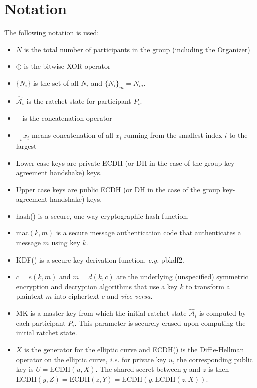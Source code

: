 \documentclass[%
preprint,
amsmath,amssymb,
aps,
prb,
floatfix,
]{revtex4-1}
\begin{document}
\section{\label{sec:notation}Notation}
The following notation is used:
\begin{itemize}
\item $N$ is the total number of participants in the group (including the
Organizer)
\item $\oplus$ is the bitwise XOR operator
\item $\{N_i\}$ is the set of all $N_i$ and $\{N_i\}_m = N_m$.
\item $\mathcal{\hat{A}}_i$ is the ratchet state for
participant $P_i$.
\item $||$ is the concatenation operator
\item $||_i \, x_i$ means concatenation of all $x_i$ running from the smallest
index $i$ to the largest
\item Lower case keys are private ECDH (or DH in the case of the group
key-agreement handshake) keys.
\item Upper case keys are public ECDH (or DH in the case of the group
key-agreement handshake) keys.
\item hash() is a secure, one-way cryptographic hash function.
\item mac$(k,m)$ is a secure message authentication code that
authenticates a message $m$ using key $k$.
\item KDF() is a secure key derivation function, \textit{e.g.} pbkdf2.
\item $c = e(k, m)$ and $m = d(k,c)$ are the underlying (unspecified) symmetric
encryption and decryption algorithms that use a key $k$ to transform a plaintext
$m$ into ciphertext $c$ and \textit{vice versa}.
\item MK is a master key from which the initial ratchet state
$\mathcal{\hat{A}}_i$ is computed by each participant $P_i$. This parameter is
securely erased upon computing the initial ratchet state.
\item $X$ is the generator for the elliptic curve and ECDH() is the Diffie-Hellman
operator on the elliptic curve, \textit{i.e.} for private key $u$, the
corresponding public key is $U = \mathrm{ECDH}(u, X)$. The shared secret between
$y$ and $z$ is then $ \mathrm{ECDH}(y,Z) = \mathrm{ECDH}(z,Y) =
\mathrm{ECDH}(y,\mathrm{ECDH}(z, X))$.
\end{itemize}
\end{document}
